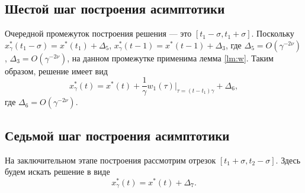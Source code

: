 \subsection{Шестой шаг построения асимптотики}

Очередной промежуток построения решения --- это $[t_1-\sigma, t_1+\sigma]$. Поскольку $x^*_{\gamma}(t_1 - \sigma) = x^*(t_1) + \Delta_5$, $x^*_{\gamma}(t - 1) = x^*(t - 1) + \Delta_3$, где $\Delta_5 = O(\gamma^{-2\nu})$, $\Delta_3 = O(\gamma^{-2\nu})$, на данном промежутке применима лемма \ref{lm:w}. Таким образом, решение имеет вид
\begin{equation}
	\label{eq:sol_6}
	x_{\gamma}^*(t) = x^*(t) + \frac{1}{\gamma} w_1(\tau)\bigg\vert_{\tau=(t - t_1)\gamma} + \Delta_6,
\end{equation}
где $\Delta_6 = O(\gamma^{-2\nu})$.


\subsection{Седьмой шаг построения асимптотики}

На заключительном этапе построения рассмотрим отрезок $[t_1+\sigma, t_2-\sigma]$. Здесь будем искать решение в виде
\begin{equation}
	\label{eq:sol_7}
	x_\gamma^*(t) = x^*(t) + \Delta_7.
\end{equation}

